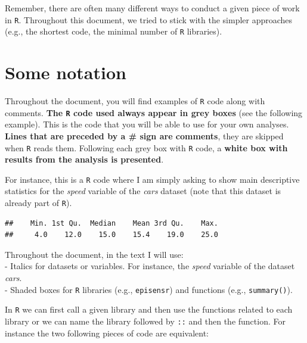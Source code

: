 \documentclass[
]{book}
\newenvironment{Shaded}{\begin{snugshade}}{\end{snugshade}}
\newcommand{\CommentTok}[1]{\textcolor[rgb]{0.56,0.35,0.01}{\textit{#1}}}
\newcommand{\FunctionTok}[1]{\textcolor[rgb]{0.00,0.00,0.00}{#1}}
\newcommand{\NormalTok}[1]{#1}
\newcommand{\SpecialCharTok}[1]{\textcolor[rgb]{0.00,0.00,0.00}{#1}}
\begin{document}
Remember, there are often many different ways to conduct a given piece
of work in \texttt{R}. Throughout this document, we tried to stick with
the simpler approaches (e.g., the shortest code, the minimal number of
\texttt{R} libraries).

\hypertarget{some-notation}{%
\section{Some notation}\label{some-notation}}

Throughout the document, you will find examples of \texttt{R} code along
with comments. \textbf{The \texttt{R} code used always appear in grey
boxes} (see the following example). This is the code that you will be
able to use for your own analyses. \textbf{Lines that are preceded by a
\# sign are comments}, they are skipped when \texttt{R} reads them.
Following each grey box with \texttt{R} code, a \textbf{white box with
results from the analysis is presented}.

For instance, this is a \texttt{R} code where I am simply asking to show
main descriptive statistics for the \emph{speed} variable of the
\emph{cars} dataset (note that this dataset is already part of
\texttt{R}).

\begin{Shaded}
\end{Shaded}

\begin{verbatim}
##    Min. 1st Qu.  Median    Mean 3rd Qu.    Max. 
##     4.0    12.0    15.0    15.4    19.0    25.0
\end{verbatim}

Throughout the document, in the text I will use:\\
- Italics for datasets or variables. For instance, the \emph{speed}
variable of the dataset \emph{cars}.\\
- Shaded boxes for \texttt{R} libraries (e.g., \texttt{episensr}) and
functions (e.g., \texttt{summary()}).

In \texttt{R} we can first call a given library and then use the
functions related to each library or we can name the library followed by
\texttt{::} and then the function. For instance the two following pieces
of code are equivalent:
\end{document}
